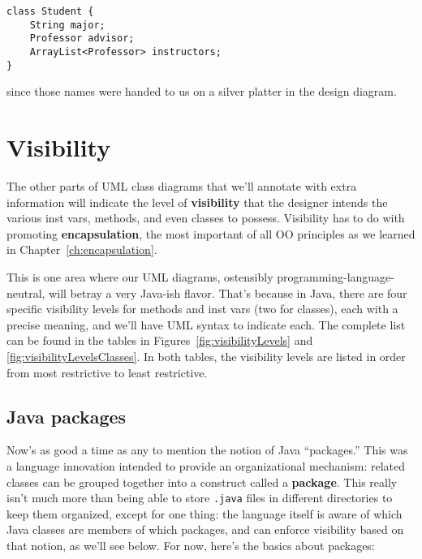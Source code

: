 \vspace{-.15in}
\begin{Verbatim}[fontsize=\small,samepage=true,frame=single]
class Student {
    String major;    
    Professor advisor;
    ArrayList<Professor> instructors;
}
\end{Verbatim}
\vspace{-.15in}

since those names were handed to us on a silver platter in the design diagram.

\section{Visibility}

The other parts of UML class diagrams that we'll annotate with extra
information will indicate the level of \textbf{visibility} that the designer
intends the various inst vars, methods, and even classes to possess.
Visibility has to do with promoting \textbf{encapsulation}, the most important
of all OO principles as we learned in Chapter~\ref{ch:encapsulation}.

This is one area where our UML diagrams, ostensibly
programming-language-neutral, will betray a very Java-ish flavor. That's
because in Java, there are four specific visibility levels for methods and
inst vars (two for classes), each with a precise meaning, and we'll have UML
syntax to indicate each. The complete list can be found in the tables in
Figures~\ref{fig:visibilityLevels} and \ref{fig:visibilityLevelsClasses}. In
both tables, the visibility levels are listed in order from most restrictive
to least restrictive.

\subsection{Java packages}
\label{sec:packages}

Now's as good a time as any to mention the notion of Java ``packages.'' This
was a language innovation intended to provide an organizational mechanism:
related classes can be grouped together into a construct called a
\textbf{package}. This really isn't much more than being able to store
\texttt{.java} files in different directories to keep them organized, except
for one thing: the language itself is aware of which Java classes are members
of which packages, and can enforce visibility based on that notion, as we'll
see below. For now, here's the basics about packages:

